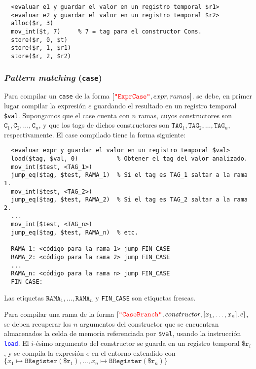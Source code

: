 \documentclass{article}
\newcommand{\astkw}[1]{\texttt{\textcolor{red}{"#1"}}}
\newcommand{\instruction}[1]{\texttt{\textcolor{blue}{#1}}}
\begin{document}
\begin{verbatim}
  <evaluar e1 y guardar el valor en un registro temporal $r1>
  <evaluar e2 y guardar el valor en un registro temporal $r2>
  alloc($r, 3)
  mov_int($t, 7)     % 7 = tag para el constructor Cons.
  store($r, 0, $t)
  store($r, 1, $r1)
  store($r, 2, $r2)
\end{verbatim}

\subsubsection{{\em Pattern matching} (\texttt{case})}

Para compilar un \texttt{case} de la forma $[\astkw{ExprCase}, expr, ramas]$.
se debe, en primer lugar compilar la expresión $e$ guardando el resultado
en un registro temporal \texttt{\$val}.
Supongamos que el case cuenta con $n$ ramas,
cuyos constructores son $\texttt{C}_1, \texttt{C}_2, \hdots, \texttt{C}_n$,
y que los tags de dichos constructores son
$\texttt{TAG}_1, \texttt{TAG}_2, \hdots, \texttt{TAG}_n$,
respectivamente.
El case compilado tiene la forma siguiente:

\begin{verbatim}
  <evaluar expr y guardar el valor en un registro temporal $val>
  load($tag, $val, 0)           % Obtener el tag del valor analizado.
  mov_int($test, <TAG_1>)
  jump_eq($tag, $test, RAMA_1)  % Si el tag es TAG_1 saltar a la rama 1.
  mov_int($test, <TAG_2>)
  jump_eq($tag, $test, RAMA_2)  % Si el tag es TAG_2 saltar a la rama 2.
  ...
  mov_int($test, <TAG_n>)
  jump_eq($tag, $test, RAMA_n)  % etc.

  RAMA_1: <código para la rama 1> jump FIN_CASE
  RAMA_2: <código para la rama 2> jump FIN_CASE
  ...
  RAMA_n: <código para la rama n> jump FIN_CASE
  FIN_CASE:
\end{verbatim}
Las etiquetas $\texttt{RAMA}_1, \hdots, \texttt{RAMA}_n$ y \texttt{FIN\_CASE}
son etiquetas frescas.
\bigskip

Para compilar una rama de la forma
$[\astkw{CaseBranch}, constructor, [x_1, \hdots, x_n], e]$,
se deben recuperar los $n$ argumentos del constructor
que se encuentran almacenados la celda de memoria referenciada
por \texttt{\$val}, usando la instrucción \instruction{load}.
El $i$-ésimo argumento del constructor se guarda en un registro
temporal $\texttt{\$r}_i$,
y se compila la expresión $e$ en el entorno extendido
con $\{
  x_1 \mapsto \texttt{BRegister}(\texttt{\$r}_1),
  \hdots,
  x_n \mapsto \texttt{BRegister}(\texttt{\$r}_n)
\}$
\end{document}
